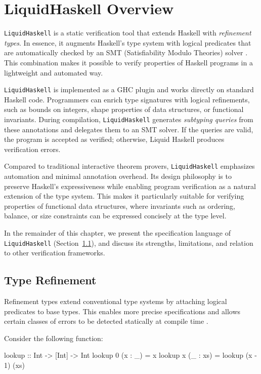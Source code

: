 \chapter { LiquidHaskell Overview }
\texttt{LiquidHaskell} is a static verification tool that extends Haskell with
\emph{refinement types}. In essence, it augments Haskell’s type system with
logical predicates that are automatically checked by an SMT (Satisfiability
Modulo Theories) solver \cite{vazou2014}. This combination makes it possible
to verify properties of Haskell programs in a lightweight and automated way.

\texttt{LiquidHaskell} is implemented as a GHC plugin and works directly on standard
Haskell code. Programmers can enrich type signatures with logical refinements,
such as bounds on integers, shape properties of data structures, or functional
invariants. During compilation, \texttt{LiquidHaskell} generates \emph{subtyping
	queries} from these annotations and delegates them to an SMT solver. If the
queries are valid, the program is accepted as verified; otherwise, Liquid
Haskell produces verification errors.

Compared to traditional interactive theorem provers, \texttt{LiquidHaskell} emphasizes
automation and minimal annotation overhead. Its design philosophy is to
preserve Haskell’s expressiveness while enabling program verification as a
natural extension of the type system. This makes it particularly suitable for
verifying properties of functional data structures, where invariants such as
ordering, balance, or size constraints can be expressed concisely at the type
level.

In the remainder of this chapter, we present the specification language of
\texttt{LiquidHaskell} (Section~\ref{sec:specification}), and discuss its strengths, limitations,
and relation to other verification frameworks.


\section{Type Refinement}
\label{sec:specification}

Refinement types extend conventional type systems by attaching logical predicates
to base types. This enables more precise specifications and allows certain classes
of errors to be detected statically at compile time \cite{vazou2014}.

Consider the following function:

\begin{code}
	lookup :: Int -> [Int] -> Int
	lookup 0 (x : _) = x
	lookup x (_ : xs) = lookup (x - 1) (xs)
\end{code}

